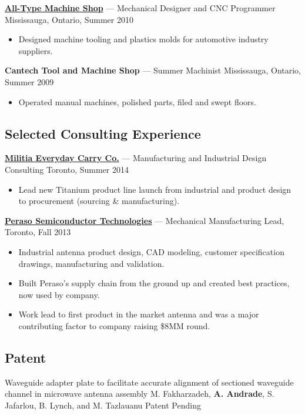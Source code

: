\documentclass[pdftex,11pt,letterpaper]{article}
\begin{document}
\href{http://atmshop.ca/}{\textbf{All-Type Machine Shop}} --- Mechanical Designer and CNC Programmer \hfill {\color{gray} Mississauga, Ontario, Summer 2010}
\begin{itemize}
\item Designed machine tooling and plastics molds for automotive industry suppliers.
\end{itemize}

\textbf{Cantech Tool and Machine Shop} --- Summer Machinist \hfill {\color{gray} Mississauga, Ontario, Summer 2009}
\begin{itemize}
\item Operated manual machines, polished parts, filed and swept floors.
\end{itemize}
  
\subsection*{Selected Consulting Experience}

\href{http://www.haloculturecanada.com/collections/titanium-flash-edc}{\textbf{Militia Everyday Carry Co.}} --- Manufacturing and Industrial Design Consulting \hfill {\color{gray} Toronto, Summer 2014}
\begin{itemize}
  \item Lead new Titanium product line launch from industrial and product design to procurement (sourcing \& manufacturing).
\end{itemize}

\href{http://www.perasotech.com/}{\textbf{Peraso Semiconductor Technologies}} --- Mechanical Manufacturing Lead, \hfill {\color{gray} Toronto, Fall 2013}
\begin{itemize}
  \item Industrial antenna product design, CAD modeling, customer specification drawings, manufacturing and validation.
  \item Built Peraso’s supply chain from the ground up and created best practices, now used by company.
  \item Work lead to first product in the market antenna and was a major contributing factor to company raising \$8MM round.
\end{itemize}

\subsection*{Patent}
Waveguide adapter plate to facilitate accurate alignment of sectioned waveguide channel in microwave antenna assembly \color{gray} {M. Fakharzadeh, \textbf{A. Andrade}, S. Jafarlou, B. Lynch, and M. Tazlauanu} \hfill {\color{gray} Patent Pending}
\color{black}
\end{document}
